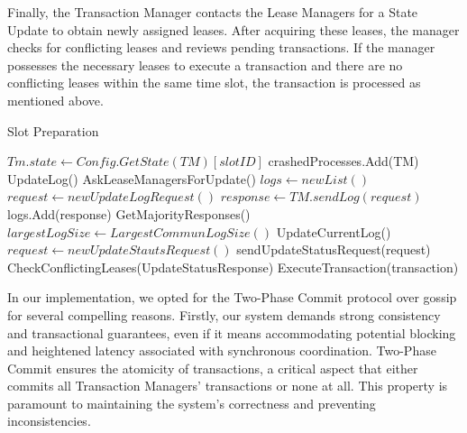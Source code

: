 \documentclass[times, 10pt,twocolumn]{article}
\begin{document}
Finally, the Transaction Manager contacts the Lease Managers for 
a State Update to obtain newly assigned leases. After acquiring 
these leases, the manager checks for conflicting leases and 
reviews pending transactions. If the manager possesses the necessary 
leases to execute a transaction and there are no conflicting leases 
within the same time slot, the transaction is processed as mentioned 
above.

\begin{algorithm}
    \caption{Slot Preparation}
    \begin{algorithmic}[1]
            \State $Tm.state \gets Config.GetState(TM)[slotID]$
                    \State crashedProcesses.Add(TM)
                \EndIf
            \EndFor
            \State UpdateLog()
            \State AskLeaseManagersForUpdate()
        \EndFunction
            \State $logs \gets new List()$
            \State $request \gets new UpdateLogRequest()$
                \State $response \gets TM.sendLog(request)$
                \State logs.Add(response)
            \EndFor
            \State GetMajorityResponses()
            \State $largestLogSize \gets LargestCommunLogSize()$
                \State UpdateCurrentLog()
            \EndIf
        \EndFunction
            \State $request \gets new UpdateStautsRequest()$
                \State sendUpdateStatusRequest(request)
            \EndFor
            \State CheckConflictingLeases(UpdateStatusResponse)
                    \State ExecuteTransaction(transaction)
                \EndIf
            \EndFor
        \EndFunction
    \end{algorithmic}
\end{algorithm}

In our implementation, we opted for the Two-Phase Commit protocol 
over gossip for several compelling reasons. Firstly, our system 
demands strong consistency and transactional guarantees, even if 
it means accommodating potential blocking and heightened latency 
associated with synchronous coordination. Two-Phase Commit ensures 
the atomicity of transactions, a critical aspect that either 
commits all Transaction Managers' transactions or none at all. 
This property is paramount to maintaining the system's correctness 
and preventing inconsistencies.
\end{document}
